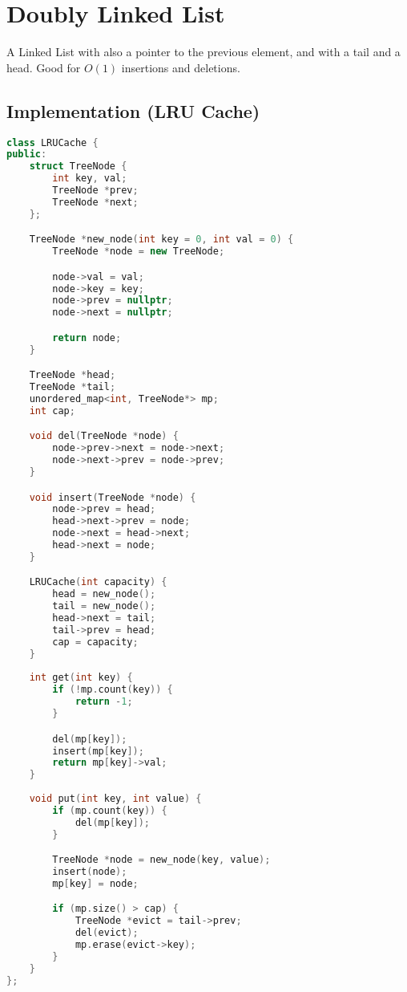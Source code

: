 \documentclass[12pt]{article}
\begin{document}
\section{Doubly Linked List}
A Linked List with also a pointer to the previous element, and with a tail and a head. Good for $O(1)$ insertions and deletions.

\subsection{Implementation (LRU Cache)}

\begin{lstlisting}[language=C++]
class LRUCache {
public:
    struct TreeNode {
        int key, val;
        TreeNode *prev;
        TreeNode *next;
    };

    TreeNode *new_node(int key = 0, int val = 0) {
        TreeNode *node = new TreeNode;

        node->val = val;
        node->key = key;
        node->prev = nullptr;
        node->next = nullptr;

        return node;
    }

    TreeNode *head;
    TreeNode *tail;
    unordered_map<int, TreeNode*> mp;
    int cap;

    void del(TreeNode *node) {
        node->prev->next = node->next;
        node->next->prev = node->prev;
    }

    void insert(TreeNode *node) {
        node->prev = head;
        head->next->prev = node;
        node->next = head->next;
        head->next = node;
    }

    LRUCache(int capacity) {
        head = new_node();
        tail = new_node();
        head->next = tail;
        tail->prev = head;
        cap = capacity;
    }
    
    int get(int key) {
        if (!mp.count(key)) {
            return -1;
        }

        del(mp[key]);
        insert(mp[key]);
        return mp[key]->val;
    }
    
    void put(int key, int value) {
        if (mp.count(key)) {
            del(mp[key]);
        }

        TreeNode *node = new_node(key, value);
        insert(node);
        mp[key] = node;

        if (mp.size() > cap) {
            TreeNode *evict = tail->prev;
            del(evict);
            mp.erase(evict->key);
        }
    }
};
\end{lstlisting}
\end{document}
